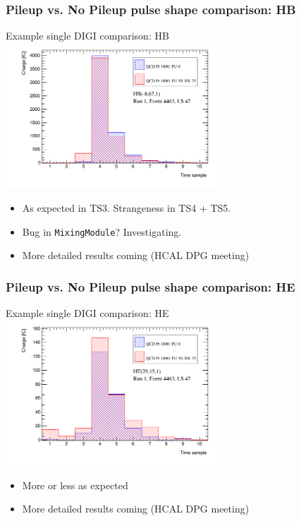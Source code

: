 \documentclass[bigger]{beamer}
\begin{document}
\begin{frame}
\frametitle{Pileup vs. No Pileup pulse shape comparison: HB}
\label{sec-2-2-3}
\label{sec-2-2-3-1}

\centering
Example single DIGI comparison: HB
\includegraphics[width=0.6\textwidth]{fig/pulse_QCD1800MC_PU_vs_NoPU.png}
\label{sec-2-2-3-2}
\begin{itemize}

\item As expected in TS3.  Strangeness in TS4 + TS5.
\label{sec-2-2-3-2-1}%

\item Bug in \texttt{MixingModule}?  Investigating.
\label{sec-2-2-3-2-2}%

\item More detailed results coming (HCAL DPG meeting)
\label{sec-2-2-3-2-3}%
\end{itemize} %
\end{frame}
\begin{frame}
\frametitle{Pileup vs. No Pileup pulse shape comparison: HE}
\label{sec-2-2-4}
\label{sec-2-2-4-1}

\centering
Example single DIGI comparison: HE
\includegraphics[width=0.6\textwidth]{fig/pulse_QCD1800MC_PU_vs_NoPU_HE.png}
\label{sec-2-2-4-2}
\begin{itemize}

\item More or less as expected
\label{sec-2-2-4-2-1}%

\item More detailed results coming (HCAL DPG meeting)
\label{sec-2-2-4-2-2}%
\end{itemize} %
\end{frame}
\end{document}
